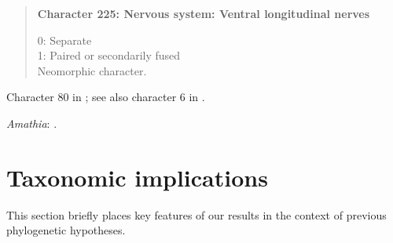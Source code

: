 \documentclass[openany]{book}
\begin{document}
\begin{quote}
\textbf{Character 225: Nervous system: Ventral longitudinal nerves}

0: Separate\\
1: Paired or secondarily fused\\
Neomorphic character.
\end{quote}

Character 80 in \citet{Glenner2004}; see also character 6 in
\citet{Vinther2008}.

\hypertarget{Amathia-coding-225}{}
\emph{Amathia}: \citet{Temereva2016Thenervous}.

\chapter{Taxonomic implications}\label{taxonomic-implications}

This section briefly places key features of our results in the context
of previous phylogenetic hypotheses.
\end{document}
